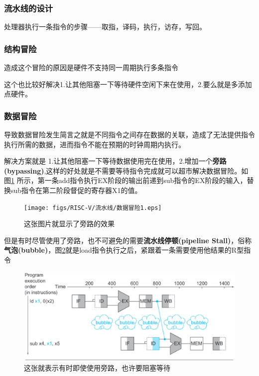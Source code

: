 \subsubsection{流水线的设计}
处理器执行一条指令的步骤——取指，译码，执行，访存，写回。

\subsubsection{结构冒险}
造成这个冒险的原因是硬件不支持同一周期执行多条指令

这个也比较好解决1.让其他阻塞一下等待硬件空闲下来在使用，2.要么就是多添加点硬件。



\subsubsection{数据冒险}
导致数据冒险发生简言之就是不同指令之间存在数据的关联，造成了无法提供指令执行所需的数据，进而指令不能在预期的时钟周期内执行。

解决方案就是 1.让其他阻塞一下等待数据使用完在使用，2.增加一个\textbf{旁路(bypassing)},这样的好处就是不需要等待指令完成就可以超市解决数据冒险。如图\ref{fig:Data_Hazards1} 所示，第一条add指令执行EX阶段的输出前递到sub指令的EX阶段的输入，替换sub指令在第二阶段督促的寄存器X1的值。

\begin{figure}[htbp]
  \centering %
  \texttt{[image: figs/RISC-V/流水线/数据冒险1.eps]}
  \caption{这张图片就显示了旁路的效果}
  \label{fig:Data_Hazards1} %
\end{figure}

但是有时尽管使用了旁路，也不可避免的需要\textbf{流水线停顿(pipeline Stall)}，俗称\textbf{气泡(bubble)}，图\ref{fig:Data_Hazards2}就是load指令执行之后，紧跟着一条需要使用他结果的R型指令

\begin{figure}[htbp]
  \centering %
  \includegraphics[width=0.8 \textwidth]{figs/RISC-V/流水线/数据冒险2.eps}
  \caption{这张就表示有时即使使用旁路，也许要阻塞等待}
  \label{fig:Data_Hazards2} %
\end{figure}


